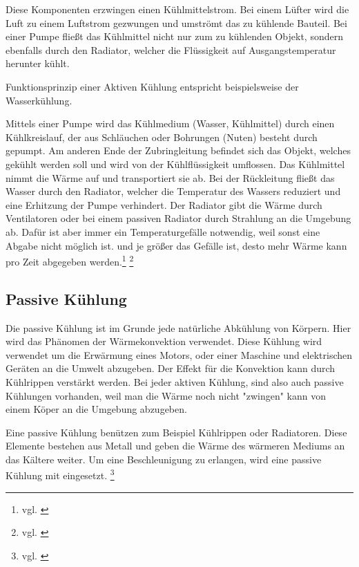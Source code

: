 Diese Komponenten erzwingen einen Kühlmittelstrom. 
Bei einem Lüfter wird die Luft zu einem Luftstrom gezwungen und umströmt das zu kühlende Bauteil. Bei einer Pumpe fließt das Kühlmittel nicht nur zum zu kühlenden Objekt, sondern ebenfalls durch den Radiator, welcher die Flüssigkeit auf Ausgangstemperatur herunter kühlt. 


Funktionsprinzip einer Aktiven Kühlung entspricht beispielsweise der Wasserkühlung.

Mittels einer Pumpe wird das Kühlmedium (Wasser, Kühlmittel) durch einen Kühlkreislauf, der aus Schläuchen oder Bohrungen (Nuten) besteht durch gepumpt. Am anderen Ende der Zubringleitung befindet sich das Objekt, welches gekühlt werden soll und wird von der Kühlflüssigkeit umflossen. 
Das Kühlmittel nimmt die Wärme auf und transportiert sie ab. Bei der Rückleitung fließt das Wasser durch den Radiator, welcher die Temperatur des Wassers reduziert und eine Erhitzung der Pumpe verhindert. 
Der Radiator gibt die Wärme durch Ventilatoren oder bei einem passiven Radiator durch Strahlung an die Umgebung ab. Dafür ist aber immer ein Temperaturgefälle notwendig, weil sonst eine Abgabe nicht möglich ist. und je größer das Gefälle ist, desto mehr Wärme kann pro Zeit abgegeben werden.\footnote{vgl. \cite{Luftkuehlung1}} \footnote{vgl. \cite{Luftkuehlung2}}

\subsection{Passive Kühlung} 

Die passive Kühlung ist im Grunde jede natürliche Abkühlung von Körpern. Hier wird das Phänomen der Wärmekonvektion verwendet. Diese Kühlung wird verwendet um die Erwärmung eines Motors, oder einer Maschine und elektrischen Geräten an die Umwelt abzugeben. Der Effekt für die Konvektion kann durch Kühlrippen verstärkt werden. Bei jeder aktiven Kühlung, sind also auch passive Kühlungen vorhanden, weil man die Wärme noch nicht "zwingen" kann von einem Köper an die Umgebung abzugeben. 

Eine passive Kühlung benützen zum Beispiel Kühlrippen oder Radiatoren. Diese Elemente bestehen aus Metall und geben die Wärme des wärmeren Mediums an das Kältere weiter. Um eine Beschleunigung zu erlangen, wird eine passive Kühlung mit eingesetzt. \footnote{vgl. \cite{PassiveKuehlung}}


\newpage

